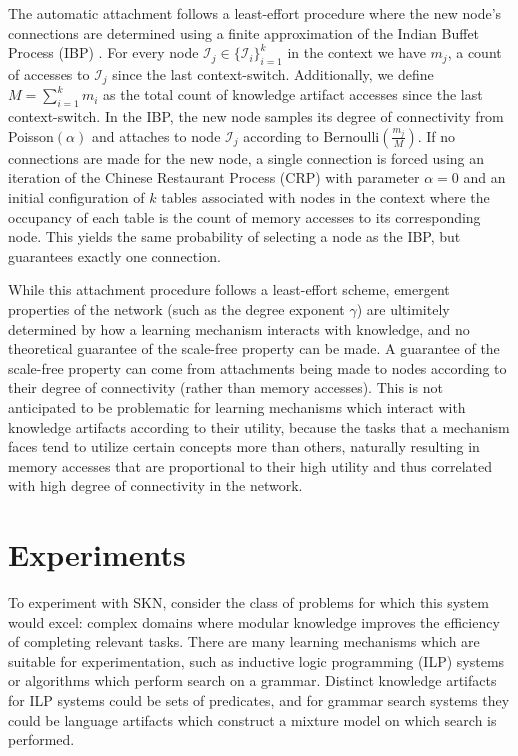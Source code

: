 \documentclass[11pt,letterpaper]{article}
\begin{document}
The automatic attachment follows a least-effort procedure where the new
node's connections are determined using a finite approximation of the Indian
Buffet Process (IBP) \cite{griffiths11}. For every node
$\mathcal{I}_j\in\{\mathcal{I}_i\}_{i=1}^k$ in the context we have $m_j$, a
count of accesses to $\mathcal{I}_j$ since the last context-switch.
Additionally, we define $M=\sum_{i=1}^km_i$ as the total count of knowledge
artifact accesses since the last context-switch. In the IBP, the new node
samples its degree of connectivity from Poisson$(\alpha)$ and attaches to
node $\mathcal{I}_j$ according to Bernoulli$\left(\frac{m_j}{M}\right)$.
If no connections are made for the new node, a single connection is forced
using an iteration of the Chinese Restaurant Process (CRP) with parameter
$\alpha=0$ and an initial configuration of $k$ tables associated with nodes
in the context where the occupancy of each table is the count of memory
accesses to its corresponding node. This yields the same probability of
selecting a node as the IBP, but guarantees exactly one connection.

While this attachment procedure follows a least-effort scheme, emergent
properties of the network (such as the degree exponent $\gamma$) are
ultimitely determined by how a learning mechanism interacts with knowledge,
and no theoretical guarantee of the scale-free property can be made. A
guarantee of the scale-free property can come from attachments being made to
nodes according to their degree of connectivity (rather than memory
accesses). This is not anticipated to be problematic for learning mechanisms
which interact with knowledge artifacts according to their utility, because
the tasks that a mechanism faces tend to utilize certain concepts more than
others, naturally resulting in memory accesses that are proportional to
their high utility and thus correlated with high degree of connectivity in
the network.

\section{Experiments}

To experiment with SKN, consider the class of problems for which this system
would excel: complex domains where modular knowledge improves the efficiency
of completing relevant tasks. There are many learning mechanisms which are
suitable for experimentation, such as inductive logic programming (ILP)
systems or algorithms which perform search on a grammar. Distinct knowledge
artifacts for ILP systems could be sets of predicates, and for grammar
search systems they could be language artifacts which construct a mixture
model on which search is performed.
\end{document}
